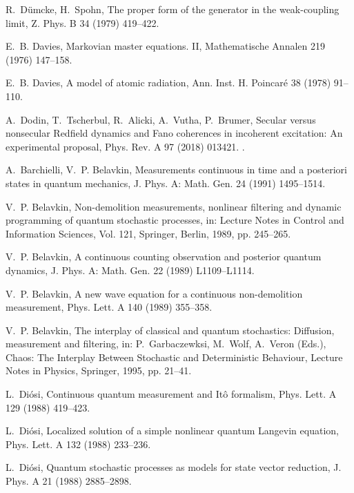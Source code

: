 \documentclass[3p,sort&compress,12pt]{elsarticle}
\begin{document}
\begin{thebibliography}{100}
R.~D{\"u}mcke, H.~Spohn, The proper form of the generator in the weak-coupling
  limit, Z. Phys. B 34 (1979) 419--422.

E.~B. Davies, Markovian master equations. {II}, Mathematische Annalen 219
  (1976) 147--158.

E.~B. Davies, A model of atomic radiation, Ann. Inst. H. Poincar{\'e} 38 (1978)
  91--110.

A.~Dodin, T.~Tscherbul, R.~Alicki, A.~Vutha, P.~Brumer, Secular versus
  nonsecular Redfield dynamics and Fano coherences in incoherent excitation: An
  experimental proposal, Phys. Rev. A 97 (2018) 013421.
\newblock \href {http://dx.doi.org/10.1103/PhysRevA.97.013421}
  {}.

A.~Barchielli, V.~P. Belavkin, Measurements continuous in time and a posteriori
  states in quantum mechanics, J. Phys. A: Math. Gen. 24 (1991) 1495--1514.

V.~P. Belavkin, Non-demolition measurements, nonlinear filtering and dynamic
  programming of quantum stochastic processes, in: Lecture Notes in Control and
  Information Sciences, Vol. 121, Springer, Berlin, 1989, pp. 245--265.

V.~P. Belavkin, A continuous counting observation and posterior quantum
  dynamics, J. Phys. A: Math. Gen. 22 (1989) L1109--L1114.

V.~P. Belavkin, A new wave equation for a continuous non-demolition
  measurement, Phys. Lett. A 140 (1989) 355--358.

V.~P. Belavkin, The interplay of classical and quantum stochastics: Diffusion,
  measurement and filtering, in: P.~Garbaczewksi, M.~Wolf, A.~Veron (Eds.),
  Chaos: The Interplay Between Stochastic and Deterministic Behaviour, Lecture
  Notes in Physics, Springer, 1995, pp. 21--41.

L.~Di{\'o}si, Continuous quantum measurement and {I}t{\^o} formalism, Phys.
  Lett. A 129 (1988) 419--423.

L.~Di{\'o}si, Localized solution of a simple nonlinear quantum {L}angevin
  equation, Phys. Lett. A 132 (1988) 233--236.

L.~Di{\'o}si, Quantum stochastic processes as models for state vector
  reduction, J. Phys. A 21 (1988) 2885--2898.


\end{thebibliography}
\end{document}
